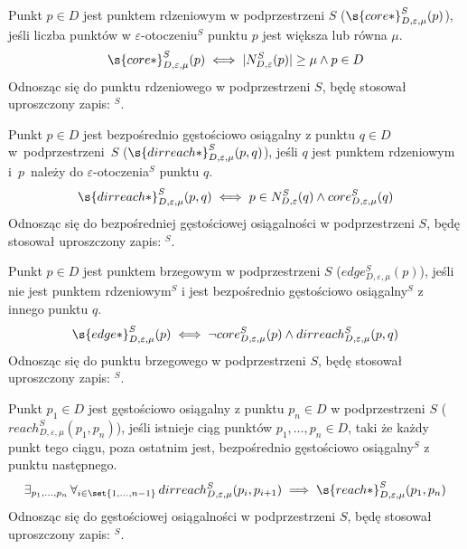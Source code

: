 \newline
Punkt $ p \in D $ jest punktem rdzeniowym w podprzestrzeni $ S $ ($ \s{core*}^S_{D,\varepsilon,\mu}(p) $), jeśli liczba punktów w $ \varepsilon $-otoczeniu$^S $ punktu $ p $ jest większa lub równa $ \mu $.
\begin{equation}
	\s{core*}^S_{D,\varepsilon,\mu}(p) \iff |N^S_{D,\varepsilon}(p)| \ge \mu \land p\in D
\end{equation}
Odnosząc się do punktu rdzeniowego w podprzestrzeni $ S $, będę stosował uproszczony zapis: \textit{$^S$}.
\smallskip

 \newline
Punkt $ p\in D $ jest bezpośrednio gęstościowo osiągalny z punktu $ q\in D $ \mbox{w podprzestrzeni $ S $} ($ \s{dirreach*}^S_{D,\varepsilon,\mu}(p, q) $), jeśli $ q $ jest punktem rdzeniowym \mbox{i $ p $ należy} do $ \varepsilon $-otoczenia$^S$ punktu $ q $.
\begin{equation}
	\s{dirreach*}^S_{D,\varepsilon,\mu}(p, q) \iff p \in N^S_{D,\varepsilon}(q) \land core^S_{D,\varepsilon,\mu}(q)
\end{equation}
Odnosząc się do bezpośredniej gęstościowej osiągalności w podprzestrzeni $ S $, będę stosował uproszczony zapis: \textit{$^S$}.
\smallskip

 \newline
Punkt $ p\in D $ jest punktem brzegowym w podprzestrzeni $ S $ ($ edge^S_{D,\varepsilon,\mu}(p) $), jeśli nie jest punktem rdzeniowym$^S$ i jest bezpośrednio gęstościowo osiągalny$^S$ z innego punktu $ q $.
\begin{equation}
	\s{edge*}^S_{D,\varepsilon,\mu}(p) \iff \neg core^S_{D,\varepsilon,\mu}(p) \land dirreach^S_{D,\varepsilon,\mu}(p,q)
\end{equation}
Odnosząc się do punktu brzegowego w podprzestrzeni $ S $, będę stosował uproszczony zapis: \textit{$^S$}.
\smallskip

 \newline
Punkt $ p_1\in D $ jest gęstościowo osiągalny z punktu $ p_n\in D $ w podprzestrzeni $ S $ \linebreak($ reach^S_{D,\varepsilon,\mu}(p_1, p_n) $), jeśli istnieje ciąg punktów $ p_1,\dots,p_n \in D $, taki że każdy punkt tego ciągu, poza ostatnim jest, bezpośrednio gęstościowo osiągalny$^S$ z punktu następnego.
\begin{equation}
	\exists_{p_1,\dots,p_n}\,\forall_{i\in\set{1,\dots,n-1}}\,dirreach^S_{D,\varepsilon,\mu}(p_i, p_{i+1}) \implies \s{reach*}^S_{D,\varepsilon,\mu}(p_1, p_n)	 
\end{equation}
Odnosząc się do gęstościowej osiągalności w podprzestrzeni $ S $, będę stosował uproszczony zapis: \textit{$^S$}.
\smallskip

